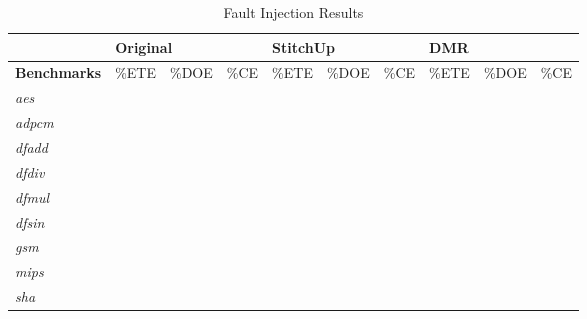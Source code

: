 \begin{table}[t]
\small
\singlespace
\centering
\caption{Fault Injection Results}
\label{tab:faults}
\tabcolsep=0.11cm
\begin{tabular}{|l|l|l|l|l|l|l|l|l|l|}
\hline
                    & \multicolumn{3}{l|}{\textbf{Original}} & \multicolumn{3}{l|}{\textbf{StitchUp}} & \multicolumn{3}{l|}{\textbf{DMR}} \\ \hline
\textbf{Benchmarks} & \%ETE       & \%DOE       & \%CE       & \%ETE       & \%DOE       & \%CE       & \%ETE      & \%DOE     & \%CE     \\ \hline
\textit{aes}        &             &             &            &             &             &            &            &           &          \\ \hline
\textit{adpcm}      &             &             &            &             &             &            &            &           &          \\ \hline
\textit{dfadd}      &             &             &            &             &             &            &            &           &          \\ \hline
\textit{dfdiv}      &             &             &            &             &             &            &            &           &          \\ \hline
\textit{dfmul}      &             &             &            &             &             &            &            &           &          \\ \hline
\textit{dfsin}      &             &             &            &             &             &            &            &           &          \\ \hline
\textit{gsm}        &             &             &            &             &             &            &            &           &          \\ \hline
\textit{mips}       &             &             &            &             &             &            &            &           &          \\ \hline
\textit{sha}        &             &             &            &             &             &            &            &           &          \\ \hline
\end{tabular}
\end{table}

